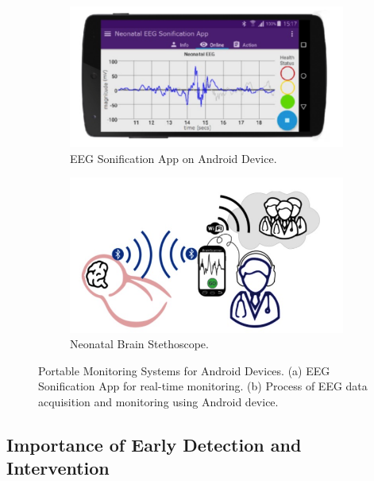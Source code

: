 \documentclass[12pt,journal,compsoc]{IEEEtran}
\begin{document}
\begin{figure}[H]
    \centering
    \begin{subfigure}[b]{0.45\linewidth}
        \includegraphics[width=\linewidth]{andorid_app_demo.png}
        \caption{EEG Sonification App on Android Device.}
        \label{fig:app_demo}
    \end{subfigure}
    \hfill
    \begin{subfigure}[b]{0.45\linewidth}
        \includegraphics[width=\linewidth]{neonatal_brain_stethoscope.png}
        \caption{Neonatal Brain Stethoscope.}
        \label{fig:brain_stethoscope}
    \end{subfigure}
    \caption{Portable Monitoring Systems for Android Devices. (a) EEG Sonification App for real-time monitoring. (b) Process of EEG data acquisition and monitoring using Android device.}
    \label{fig:portable_eeg_systems}
\end{figure}


\subsection{Importance of Early Detection and Intervention}
\end{document}
